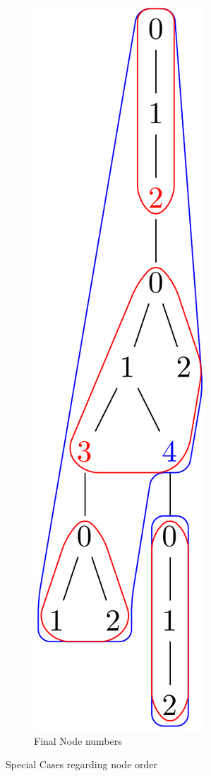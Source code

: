 \documentclass{article}
\begin{document}
\begin{figure}[ht]
\begin{subfigure}{2.5cm}
		\includegraphics[scale=0.21]{F3C3Tree}
		\caption{Final Node numbers}
		\label{factory:subim3}
	\end{subfigure}

\caption{Special Cases regarding node order}
\label{factory:images4}
\end{figure}
\end{document}

